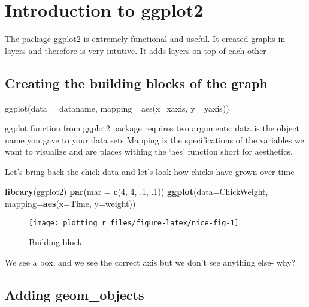 \documentclass[
]{book}
\newenvironment{Shaded}{\begin{snugshade}}{\end{snugshade}}
\newcommand{\DataTypeTok}[1]{\textcolor[rgb]{0.13,0.29,0.53}{#1}}
\newcommand{\DecValTok}[1]{\textcolor[rgb]{0.00,0.00,0.81}{#1}}
\newcommand{\FloatTok}[1]{\textcolor[rgb]{0.00,0.00,0.81}{#1}}
\newcommand{\KeywordTok}[1]{\textcolor[rgb]{0.13,0.29,0.53}{\textbf{#1}}}
\newcommand{\NormalTok}[1]{#1}
\begin{document}
\hypertarget{introduction-to-ggplot2}{%
\chapter{Introduction to ggplot2}\label{introduction-to-ggplot2}}

The package ggplot2 is extremely functional and useful. It created graphs in layers and therefore is very intutive. It adds layers on top of each other

\hypertarget{creating-the-building-blocks-of-the-graph}{%
\section{Creating the building blocks of the graph}\label{creating-the-building-blocks-of-the-graph}}

ggplot(data = dataname, mapping= aes(x=xaxis, y= yaxis))

ggplot function from ggplot2 package requires two arguments:
data is the object name you gave to your data sets
Mapping is the specifications of the variables we want to visualize and are places withing the `aes' function short for aesthetics.

Let's bring back the chick data and let's look how chicks have grown over time

\begin{Shaded}
\begin{Highlighting}[]
\KeywordTok{library}\NormalTok{(ggplot2)}
\KeywordTok{par}\NormalTok{(}\DataTypeTok{mar =} \KeywordTok{c}\NormalTok{(}\DecValTok{4}\NormalTok{, }\DecValTok{4}\NormalTok{, }\FloatTok{.1}\NormalTok{, }\FloatTok{.1}\NormalTok{))}
\KeywordTok{ggplot}\NormalTok{(}\DataTypeTok{data=}\NormalTok{ChickWeight, }\DataTypeTok{mapping=}\KeywordTok{aes}\NormalTok{(}\DataTypeTok{x=}\NormalTok{Time, }\DataTypeTok{y=}\NormalTok{weight))}
\end{Highlighting}
\end{Shaded}

\begin{figure}

{\centering \texttt{[image: plotting\_r\_files/figure-latex/nice-fig-1]} 

}

\caption{Building block}\label{fig:nice-fig}
\end{figure}

We see a box, and we see the correct axis but we don't see anything else- why?

\hypertarget{adding-geom_objects}{%
\section{Adding geom\_objects}\label{adding-geom_objects}}
\end{document}
